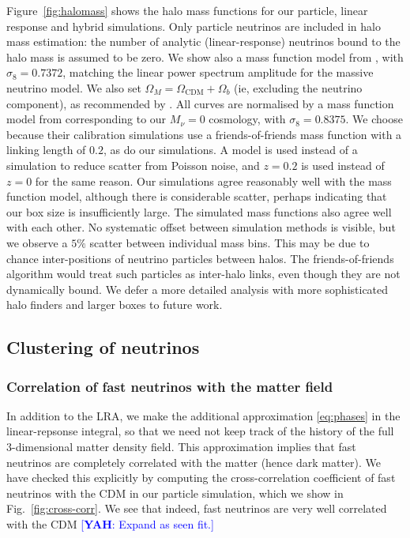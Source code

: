 \documentclass[useAMS, usenatbib]{mnras}
\newcommand{\yah}[1]{{\textcolor{blue}{[{\bf YAH}: #1]}}}
\begin{document}
Figure~\ref{fig:halomass} shows the halo mass functions for our particle, linear response and hybrid simulations. Only particle neutrinos are included in halo mass estimation: the number of analytic (linear-response) neutrinos bound to the halo mass is assumed to be zero. We show also a mass function model from \cite{Watson_2013}, with $\sigma_8 = 0.7372$, matching the linear power spectrum amplitude for the massive neutrino model. We also set $\Omega_M = \Omega_\mathrm{CDM} + \Omega_b$ (ie, excluding the neutrino component), as recommended by \cite{FVN_2014}. All curves are normalised by a mass function model from \cite{Watson_2013} corresponding to our $M_\nu = 0$ cosmology, with $\sigma_8 = 0.8375$. We choose \cite{Watson_2013} because their calibration simulations use a friends-of-friends mass function with a linking length of $0.2$, as do our simulations. A model is used instead of a simulation to reduce scatter from Poisson noise, and $z=0.2$ is used instead of $z=0$ for the same reason. Our simulations agree reasonably well with the mass function model, although there is considerable scatter, perhaps indicating that our box size is insufficiently large. The simulated mass functions also agree well with each other. No systematic offset between simulation methods is visible, but we observe a $5\%$ scatter between individual mass bins. This may be due to chance inter-positions of neutrino particles between halos. The friends-of-friends algorithm would treat such particles as inter-halo links, even though they are not dynamically bound. We defer a more detailed analysis with more sophisticated halo finders and larger boxes to future work.

\subsection{Clustering of neutrinos}
\label{sec:nupower}

\subsubsection{Correlation of fast neutrinos with the matter field}

In addition to the LRA, we make the additional approximation \eqref{eq:phases} in the linear-repsonse integral, so that we need not keep track of the history of the full 3-dimensional matter density field. This approximation implies that fast neutrinos are completely correlated with the matter (hence dark matter). We have checked this explicitly by computing the cross-correlation coefficient of fast neutrinos with the CDM in our particle simulation, which we show in Fig.~\ref{fig:cross-corr}. We see that indeed, fast neutrinos are very well correlated with the CDM \yah{Expand as seen fit.}
\end{document}
